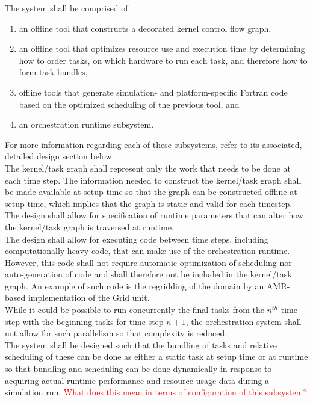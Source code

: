 \documentclass{article}
\begin{document}
The system shall be comprised of
\begin{enumerate}
\item{an offline tool that constructs a decorated kernel control flow graph,}
\item{an offline tool that optimizes resource use and execution time by
determining how to order tasks, on which hardware to run each task, and
therefore how to form task bundles,}
\item{offline tools that generate simulation- and platform-specific Fortran code
based on the optimized scheduling of the previous tool, and}
\item{an orchestration runtime subsystem.}
\end{enumerate}
For more information regarding each of these subsystems, refer to its
associated, detailed design section below.\\

The kernel/task graph shall represent only the work that needs to be done at
each time step.  The information needed to construct the kernel/task graph shall
be made available at setup time so that the graph can be constructed offline at
setup time, which implies that the graph is static and valid for each
timestep.\\

The design shall allow for specification of runtime parameters that can alter
how the kernel/task graph is traversed at runtime.\\

The design shall allow for executing code between time steps, including
computationally-heavy code, that can make use of the orchestration runtime.
However, this code shall not require automatic optimization of scheduling nor
auto-generation of code and shall therefore not be included in the kernel/task
graph.  An example of such code is the regridding of the domain by an AMR-based
implementation of the Grid unit.\\

While it could be possible to run concurrently the final tasks from the $n^{th}$
time step with the beginning tasks for time step $n+1$, the orchestration
system shall not allow for such parallelism so that complexity is reduced.\\ 

The system shall be designed such that the bundling of tasks and relative
scheduling of these can be done as either a static task at setup time or at
runtime so that bundling and scheduling can be done dynamically in response to
acquiring actual runtime performance and resource usage data during a simulation
run.  \textcolor{red}{What does this mean in terms of configuration of this
subsystem?}\\
\end{document}

